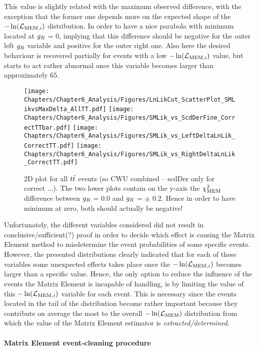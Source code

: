 This value is slightly related with the maximum observed difference, with the exception that the former one depends more on the expected shape of the $-\ln(\mathcal{L}_{\textrm{MEM}, i})$ distribution.
In order to have a nice parabola with minimum located at $g_{R}$ = 0, implying that this difference should be negative for the outer left $g_{R}$ variable and positive for the outer right one.
Also here the desired behaviour is recovered partially for events with a low $-\ln(\mathcal{L}_{\textrm{MEM}, i})$ value, but starts to act rather abnormal once this variable becomes larger than approximately $65$.
\\
\begin{figure}[h!t]
 \centering
 \texttt{[image: Chapters/Chapter6\_Analysis/Figures/LnLikCut\_ScatterPlot\_SMLikvsMaxDelta\_AllTT.pdf]}
 \texttt{[image: Chapters/Chapter6\_Analysis/Figures/SMLik\_vs\_ScdDerFine\_CorrectTTbar.pdf]}
 \texttt{[image: Chapters/Chapter6\_Analysis/Figures/SMLik\_vs\_LeftDeltaLnLik\_CorrectTT.pdf]}
 \texttt{[image: Chapters/Chapter6\_Analysis/Figures/SMLik\_vs\_RightDeltaLnLik\_CorrectTT.pdf]}
 \caption{2D plot for all $t\bar{t}$ events (so CWU combined -- scdDer only for correct ...). The two lower plots contain on the y-axis the $\chi^{2}_{\textrm{MEM}}$ difference between $g_{R}$ = 0.0 and $g_{R}$ = $\pm$ 0.2. Hence in order to have minimum at zero, both should actually be negative!} \label{fig::SMLik2D}
\end{figure}

Unfortunately, the different variables considered did not result in conclusive/sufficient(?) proof in order to decide which effect is causing the Matrix Element method to misdetermine the event probabilities of some specific events.
However, the presented distributions clearly indicated that for each of these variables some unexpected effects takes place once the $-\ln(\mathcal{L}_{\textrm{MEM}, i})$ becomes larger than a specific value.
Hence, the only option to reduce the influence of the events the Matrix Element is incapable of handling, is by limiting the value of this $-\ln(\mathcal{L}_{\textrm{MEM}, i})$ variable for each event.
This is necessary since the events located in the tail of the distribution become rather important because they contribute on average the most to the overall $-\ln(\mathcal{L}_{\textrm{MEM}})$ distribution from which the value of the Matrix Element estimator is \textit{extracted/determined}.


\paragraph{Matrix Element event-cleaning procedure} \hfill \\

